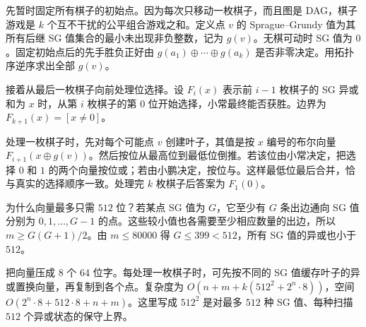 \Legend
先暂时固定所有棋子的初始点。因为每次只移动一枚棋子，而且图是 DAG，棋子游戏是 $k$ 个互不干扰的公平组合游戏之和。定义点 $v$ 的 Sprague–Grundy 值为其所有后继 SG 值集合的最小未出现非负整数，记为 $g(v)$。无棋可动时 SG 值为 $0$。固定初始点后的先手胜负正好由 $g(a_1)\oplus\cdots\oplus g(a_k)$ 是否非零决定。用拓扑序逆序求出全部 $g(v)$。

接着从最后一枚棋子向前处理位选择。设 $F_i(x)$ 表示前 $i-1$ 枚棋子的 SG 异或和为 $x$ 时，从第 $i$ 枚棋子的第 $0$ 位开始选择，小常最终能否获胜。边界为 $F_{k+1}(x)=[x\ne0]$。

处理一枚棋子时，先对每个可能点 $v$ 创建叶子，其值是按 $x$ 编号的布尔向量 $F_{i+1}(x\oplus g(v))$。然后按位从最高位到最低位倒推。若该位由小常决定，把选择 $0$ 和 $1$ 的两个向量按位或；若由小鹏决定，按位与。这样最低位最后合并，恰与真实的选择顺序一致。处理完 $k$ 枚棋子后答案为 $F_1(0)$。

为什么向量最多只需 $512$ 位？若某点 SG 值为 $G$，它至少有 $G$ 条出边通向 SG 值分别为 $0,1,\ldots,G-1$ 的点。这些较小值也各需要至少相应数量的出边，所以 $m\ge G(G+1)/2$。由 $m\le80000$ 得 $G\le399<512$，所有 SG 值的异或也小于 $512$。

把向量压成 $8$ 个 64 位字。每处理一枚棋子时，可先按不同的 SG 值缓存叶子的异或置换向量，再复制到各个点。复杂度为 $O(n+m+k(512^2+2^n\cdot 8))$，空间 $O(2^n\cdot8+512\cdot8+n+m)$。这里写成 $512^2$ 是对最多 $512$ 种 SG 值、每种扫描 $512$ 个异或状态的保守上界。
